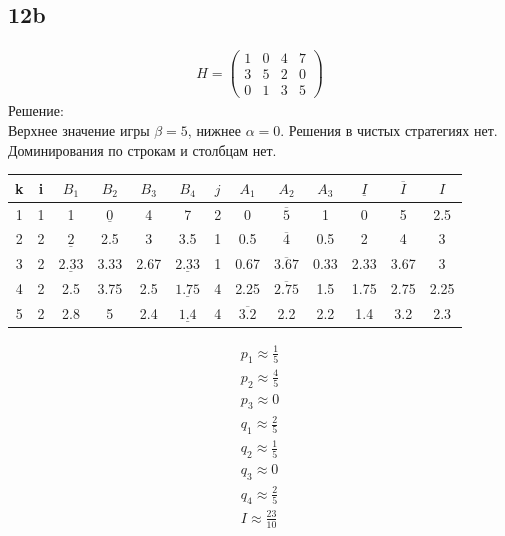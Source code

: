 \documentclass{article}
\begin{document}
\subsection*{12b}
\begin{gather*}H = \left(\begin{matrix}
1 & 0 & 4 & 7\\
3 & 5 & 2 & 0\\
0 & 1 & 3 & 5
\end{matrix}\right)\end{gather*}
Решение:\\
Верхнее значение игры $\beta=5$, нижнее $\alpha=0$. Решения в чистых стратегиях нет. Доминирования по строкам и столбцам нет.\\
\begin{tabular}{||c||c||c|c|c|c||c||c|c|c||c||c||c||}
\hline
k & i & $B_1$ & $B_2$ & $B_3$ & $B_4$ & $j$ & $A_1$ & $A_2$ & $A_3$ & $\underline{I}$ & $\overline{I}$ & $I$\\
\hline
1 & 1 & 1 & $\underline{0}$ & 4 & 7 & 2 & 0 & $\overline{5}$ & 1 & 0 & 5 & 2.5\\
\hline
2 & 2 & $\underline{2}$ & 2.5 & 3 & 3.5 & 1 & 0.5 & $\overline{4}$ & 0.5 & 2 & 4 & 3\\
\hline
3 & 2 & $\underline{2.33}$ & 3.33 & 2.67 & $\underline{2.33}$ & 1 & 0.67 & $\overline{3.67}$ & 0.33 & 2.33 & 3.67 & 3\\
\hline
4 & 2 & 2.5 & 3.75 & 2.5 & $\underline{1.75}$ & 4 & 2.25 & $\overline{2.75}$ & 1.5 & 1.75 & 2.75 & 2.25\\
\hline
5 & 2 & 2.8 & 5 & 2.4 & $\underline{1.4}$ & 4 & $\overline{3.2}$ & 2.2 & 2.2 & 1.4 & 3.2 & 2.3\\
\hline
\end{tabular}
\begin{gather*}
p_1 \approx \frac{1}{5}\\
p_2 \approx \frac{4}{5}\\
p_3 \approx 0\\
q_1 \approx \frac{2}{5}\\
q_2 \approx \frac{1}{5}\\
q_3 \approx 0\\
q_4 \approx \frac{2}{5}\\
I \approx \frac{23}{10}
\end{gather*}
\end{document}
